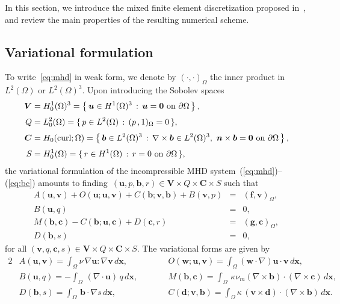 \documentclass{siamltex}
\newcommand{\uu}[1]{\boldsymbol #1}                     %
\begin{document}
 In this section, we introduce the mixed finite element discretization proposed in~\cite{Greif10},
 and review the main properties of the resulting numerical scheme.

\subsection{Variational formulation}
\label{sec:variation}

To write~\eqref{eq:mhd} in weak form, we denote by
$(\cdot,\cdot)_\Omega$ the inner product in $L^2(\Omega)$ or
$L^2(\Omega)^3$. Upon introducing the Sobolev spaces
\begin{align*}
\uu{V}&=H^1_0(\Omega)^3=\left\{\,\uu{u}\in H^1(\Omega)^3\,:\,\text{$\uu{u}=\uu{0}$ on $\partial\Omega$}\,\right\},\\[.1cm]
Q&=L^2_0(\Omega)=\{\,p\in L^2(\Omega)\,:\,(p\,,1)_\Omega=0\,\},\\[.1cm]
\uu{C}&=H_0({\rm curl};\Omega) = \left\{\,\uu{b}\in L^2(\Omega)^3\,:\,\nabla\times\uu{b}\in L^2(\Omega)^{3}, \
\text{$\uu{n}\times\uu{b}=\uu{0}$ on $\partial\Omega$}\,\right\},\\[.1cm]
S&=H^1_0(\Omega)=\{\,r\in H^1(\Omega)\,:\,r=0\ \mbox{on
$\partial\Omega$}\,\},
\end{align*}
the variational formulation of the incompressible MHD
system~(\ref{eq:mhd})--(\ref{eq:bc}) amounts to
finding~$(\uu{u},p,\uu{b},r)\in \uu{V} \times Q\times \uu{C} \times
S$ such that
\begin{subequations}
\label{eq:weak}
\begin{eqnarray}
\label{eq:weak1} A(\uu{u},\uu{v}) + O(\uu{u};\uu{u},\uu{v})
+C(\uu{b};\uu{v},\uu{b})
+B(\uu{v}, p) & =& (\uu{f}, \uu{v})_{\Omega},\\[.1cm]
\label{eq:weak2}
B(\uu{u},q)&=&0, \\[.1cm]
\label{eq:weak3}
M(\uu{b},\uu{c})-C(\uu{b};\uu{u},\uu{c})+D(\uu{c},r)&=& (\uu{g},\uu{c})_\Omega, \\[.1cm]
\label{eq:weak4} D(\uu{b},s)&=&0,
\end{eqnarray}
\end{subequations}
for all $(\uu{v},q,\uu{c},s)\in \uu{V} \times Q\times \uu{C}\times
S$. The variational forms are given by
\begin{alignat*}2
&A(\uu{u},\uu{v})=  \int_\Omega \nu \, \nabla\uu{u}:
\nabla\uu{v}\,d\uu{x},&\qquad  & O(\uu{w};\uu{u},\uu{v}) = \int_\Omega
(\uu{w}\cdot\nabla)\uu{u} \cdot\uu{v} \, d\uu{x},
\\[.1cm]
&  B(\uu{u},q) = -\int_\Omega\,(\nabla\cdot\uu{u}) \,q \,d\uu{x},
&\qquad  &
 M(\uu{b},\uu{c})= \int_\Omega\, \kappa\nu_m
(\nabla\times\uu{b})\cdot(\nabla\times\uu{c})\,d\uu{x},\\[0.1cm]
& D(\uu{b},s) = \int_\Omega\, \uu{b} \cdot \nabla s\,
d\uu{x}, & \qquad &
C(\uu{d};\uu{v},\uu{b}) =  \int_\Omega \kappa\, (\uu{v}\times\uu{d})\cdot
(\nabla\times\uu{b})\, d\uu{x}.
\end{alignat*}
\end{document}
